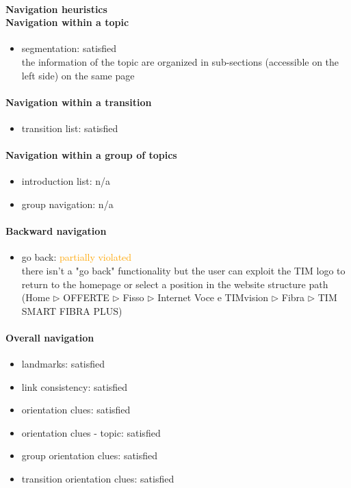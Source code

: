 \begin{enumerate}
	\paragraph*{Navigation heuristics \\ Navigation within a topic}
	\begin{itemize}
		\item segmentation: satisfied\\
		the information of the topic are organized in sub-sections (accessible on the left side) on the same page
	\end{itemize}	

	\paragraph*{Navigation within a transition}
	\begin{itemize}
		\item transition list: satisfied
	\end{itemize}

	\paragraph*{Navigation within a group of topics}
	\begin{itemize}
		\item introduction list: n/a
		\item group navigation: n/a
	\end{itemize}

	\paragraph*{Backward navigation}
	\begin{itemize}
		\item go back: \textcolor {orange}{partially violated}\\
		there isn't a "go back" functionality but the user can exploit the TIM logo to return to the homepage or select a position in the website structure path (Home $\triangleright$ OFFERTE $\triangleright$ Fisso $\triangleright$ Internet Voce e TIMvision $\triangleright$ Fibra $\triangleright$ TIM SMART FIBRA PLUS)
	\end{itemize}

	\paragraph*{Overall navigation}
	\begin{itemize}
		\item landmarks: satisfied
		\item link consistency: satisfied
		\item orientation clues: satisfied
		\item orientation clues - topic: satisfied
		\item group orientation clues: satisfied
		\item transition orientation clues: satisfied
	\end{itemize}	


\end{enumerate}

